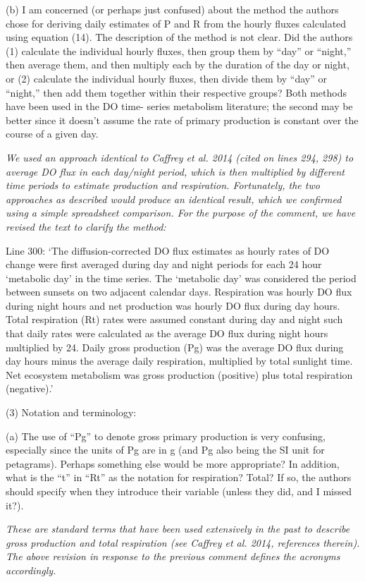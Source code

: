 \documentclass[letterpaper,12pt]{article}\usepackage[]{graphicx}\usepackage[]{color}
\begin{document}
(b) I am concerned (or perhaps just confused) about the method the authors chose for deriving daily estimates of P and R from the hourly fluxes calculated using equation (14). The description of the method is not clear. Did the authors (1) calculate the individual hourly fluxes, then group them by “day” or “night,” then average them, and then multiply each by the duration of the day or night, or (2) calculate the individual hourly fluxes, then divide them by “day” or “night,” then add them together within their respective groups? Both methods have been used in the DO time- series metabolism literature; the second may be better since it doesn’t assume the rate of primary production is constant over the course of a given day.

{\it We used an approach identical to Caffrey et al. 2014 (cited on lines 294, 298) to average DO flux in each day/night period, which is then multiplied by different time periods to estimate production and respiration.  Fortunately, the two approaches as described would produce an identical result, which we confirmed using a simple spreadsheet comparison.  For the purpose of the comment, we have revised the text to clarify the method:

Line 300: `The diffusion-corrected DO flux estimates as hourly rates of DO change were first averaged during day and night periods for each 24 hour `metabolic day' in the time series. The `metabolic day' was considered the period between sunsets on two adjacent calendar days.  Respiration was hourly DO flux during night hours and net production was hourly DO flux during day hours.  Total respiration (Rt) rates were assumed constant during day and night such that daily rates were calculated as the average DO flux during night hours multiplied by 24. Daily gross production (Pg) was the average DO flux during day hours minus the average daily respiration, multiplied by total sunlight time.  Net ecosystem metabolism was gross production (positive) plus total respiration (negative).'
}

(3) Notation and terminology:

(a) The use of “Pg” to denote gross primary production is very confusing, especially since the units of Pg are in g (and Pg also being the SI unit for petagrams). Perhaps something else would be more appropriate? In addition, what is the “t” in “Rt” as the notation for respiration? Total? If so, the authors should specify when they introduce their variable (unless they did, and I missed it?).

{\it These are standard terms that have been used extensively in the past to describe gross production and total respiration (see Caffrey et al. 2014, references therein). The above revision in response to the previous comment defines the acronyms accordingly.}
\end{document}
